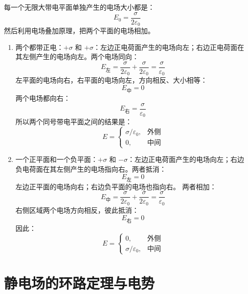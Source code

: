 \documentclass[lang=cn,11pt]{elegantbook}
\begin{document}
\begin{note}[两个平行带电平面的电场叠加]
每一个无限大带电平面单独产生的电场大小都是：
\[
E_0=\frac{\sigma}{2\varepsilon_0}
\]然后利用电场叠加原理，把两个平面的电场相加。
\begin{enumerate}
  \item 两个都带正电：\(+\sigma\) 和 \(+\sigma\)：左边正电荷面产生的电场向左；右边正电荷面在其左侧产生的电场向左。两个电场同向：
\[E_{\text{左}}=\frac{\sigma}{2\varepsilon_0}+\frac{\sigma}{2\varepsilon_0}=\frac{\sigma}{\varepsilon_0}\]左平面的电场向右，右平面的电场向左，方向相反、大小相等：
\[
E_{\text{中}}=0
\]两个电场都向右：
\[
E_{\text{右}}=
\frac{\sigma}{\varepsilon_0}
\]所以两个同号带电平面之间的结果是：
\[
\boxed{
E=
\begin{cases}
\sigma/\varepsilon_0,&\text{外侧}\\
0,&\text{中间}
\end{cases}
}
\]
\item 一个正平面和一个负平面：\(+\sigma\) 和 \(-\sigma\)：左边正电荷面产生的电场向左；右边负电荷面在其左侧产生的电场指向右。两者抵消：
\[
E_{\text{左}}=0
\]左边正平面的电场向右；右边负平面的电场也指向右。
两者相加：
\[E_{\text{中}}=\frac{\sigma}{2\varepsilon_0}+\frac{\sigma}{2\varepsilon_0}=\frac{\sigma}{\varepsilon_0}\]
右侧区域两个电场方向相反，彼此抵消：
\[
E_{\text{右}}=0
\]因此：
\[\boxed{E=\begin{cases}0,&\text{外侧}\\\sigma/\varepsilon_0,&\text{中间}\end{cases}}\]
\end{enumerate}
\end{note}

\section{静电场的环路定理与电势}
\end{document}
